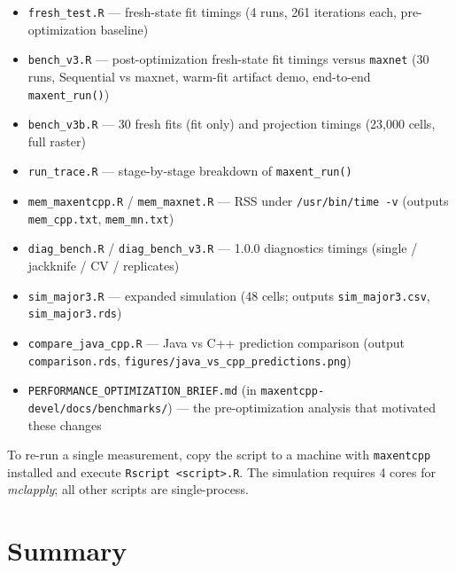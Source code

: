 \begin{itemize}[leftmargin=1.2em]
\item \texttt{fresh\_test.R} --- fresh-state fit timings (4 runs,
  261 iterations each, pre-optimization baseline)
\item \texttt{bench\_v3.R} --- post-optimization fresh-state fit
  timings versus \texttt{maxnet} (30 runs, Sequential vs maxnet,
  warm-fit artifact demo, end-to-end \texttt{maxent\_run()})
\item \texttt{bench\_v3b.R} --- 30 fresh fits (fit only) and projection
  timings (23,000 cells, full raster)
\item \texttt{run\_trace.R} --- stage-by-stage breakdown of
  \texttt{maxent\_run()}
\item \texttt{mem\_maxentcpp.R} / \texttt{mem\_maxnet.R} --- RSS under
  \texttt{/usr/bin/time -v} (outputs \texttt{mem\_cpp.txt},
  \texttt{mem\_mn.txt})
\item \texttt{diag\_bench.R} / \texttt{diag\_bench\_v3.R} --- 1.0.0
  diagnostics timings (single / jackknife / CV / replicates)
\item \texttt{sim\_major3.R} --- expanded simulation (48 cells;
  outputs \texttt{sim\_major3.csv}, \texttt{sim\_major3.rds})
\item \texttt{compare\_java\_cpp.R} --- Java vs C++ prediction
  comparison (output \texttt{comparison.rds},
  \texttt{figures/java\_vs\_cpp\_predictions.png})
\item \texttt{PERFORMANCE\_OPTIMIZATION\_BRIEF.md} (in
  \texttt{maxentcpp-devel/docs/benchmarks/}) --- the pre-optimization
  analysis that motivated these changes
\end{itemize}

To re-run a single measurement, copy the script to a machine with
\texttt{maxentcpp} installed and execute
\texttt{Rscript <script>.R}.  The simulation requires 4 cores for
\emph{mclapply}; all other scripts are single-process.

\section{Summary}


